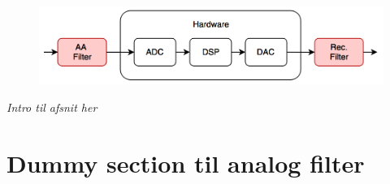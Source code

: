 \begin{figure}[h]
	\centering
	\includegraphics[width=15cm]{billeder/flow_filter}
	\centering	
\end{figure}

\emph{Intro til afsnit her}

\section{Dummy section til analog filter}\label{sec:analog_filter}
